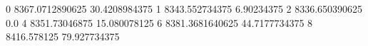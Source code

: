 0 8367.0712890625 30.4208984375
1 8343.552734375 6.90234375
2 8336.650390625 0.0
4 8351.73046875 15.080078125
6 8381.3681640625 44.7177734375
8 8416.578125 79.927734375
